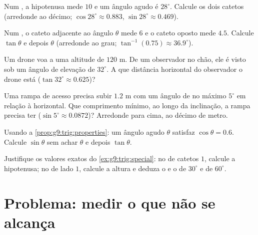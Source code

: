 \begin{exercise}[$\star$]\label{exo:g9:trig:4}
Num , a hipotenusa mede $10$ e um ângulo agudo é
$28^\circ$. Calcule os dois catetos (arredonde ao décimo;
$\cos 28^\circ \approx 0.883$, $\sin 28^\circ \approx 0.469$).
\end{exercise}

\begin{exercise}[$\star$]\label{exo:g9:trig:5}
Num , o cateto adjacente ao ângulo $\theta$ mede $6$
e o cateto oposto mede $4.5$. Calcule $\tan\theta$ e depois $\theta$
(arredonde ao grau; $\tan^{-1}(0.75) \approx 36.9^\circ$).
\end{exercise}

\begin{exercise}[$\star\star$]\label{exo:g9:trig:6}
Um drone voa a uma altitude de $120$ m. De um observador no chão, ele é
visto sob um ângulo de elevação de $32^\circ$. A que distância
horizontal do observador o drone está
($\tan 32^\circ \approx 0.625$)?
\end{exercise}

\begin{exercise}[$\star\star$]\label{exo:g9:trig:7}
Uma rampa de acesso precisa subir $1.2$ m com um ângulo de no máximo
$5^\circ$ em relação à horizontal. Que comprimento mínimo, ao longo da
inclinação, a rampa precisa ter ($\sin 5^\circ \approx 0.0872$)?
Arredonde para cima, ao décimo de metro.
\end{exercise}

\begin{exercise}[$\star\star$]\label{exo:g9:trig:8}
Usando a \cref{prop:g9:trig:properties}: um ângulo agudo $\theta$
satisfaz $\cos\theta = 0.6$. Calcule $\sin\theta$ sem achar $\theta$ e
depois $\tan\theta$.
\end{exercise}

\begin{exercise}[$\star\star\star$]\label{exo:g9:trig:9}
Justifique os valores exatos do \cref{ex:g9:trig:special}: no   de catetos $1$, calcule a hipotenusa; no  de lado $1$, calcule a altura e deduza o  e o  de
$30^\circ$ e de $60^\circ$.
\end{exercise}

\section{Problema: medir o que não se alcança}

